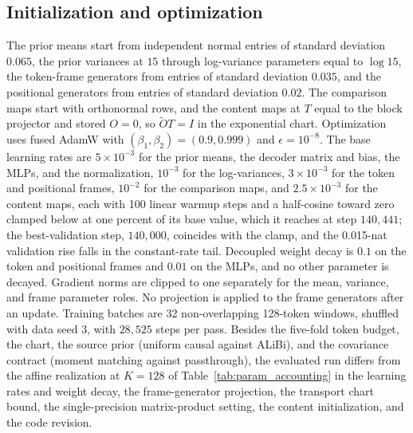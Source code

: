\documentclass[twoside,11pt]{article}
\begin{document}
\subsection{Initialization and optimization}
\label{app:run_optimization}

The prior means start from independent normal entries of standard deviation $0.065$, the prior variances at $15$ through log-variance parameters equal to $\log15$, the token-frame generators from entries of standard deviation $0.035$, and the positional generators from entries of standard deviation $0.02$. %
The comparison maps start with orthonormal rows, and the content maps at $T$ equal to the block projector and stored $O=0$, so $\widetilde OT=I$ in the exponential chart. %
Optimization uses fused AdamW \citep{Loshchilov2019AdamW} with $(\beta_1,\beta_2)=(0.9,0.999)$ and $\epsilon=10^{-8}$. The base learning rates are $5\times10^{-3}$ for the prior means, the decoder matrix and bias, the MLPs, and the normalization, $10^{-3}$ for the log-variances, $3\times10^{-3}$ for the token and positional frames, $10^{-2}$ for the comparison maps, and $2.5\times10^{-3}$ for the content maps, each with 100 linear warmup steps and a half-cosine toward zero clamped below at one percent of its base value, which it reaches at step $140{,}441$; the best-validation step, $140{,}000$, coincides with the clamp, and the 0.015-nat validation rise falls in the constant-rate tail. %
Decoupled weight decay is $0.1$ on the token and positional frames and $0.01$ on the MLPs, and no other parameter is decayed. %
Gradient norms are clipped to one separately for the mean, variance, and frame parameter roles. %
No projection is applied to the frame generators after an update. %
Training batches are 32 non-overlapping 128-token windows, shuffled with data seed 3, with $28{,}525$ steps per pass. %
Besides the five-fold token budget, the chart, the source prior (uniform causal against ALiBi), and the covariance contract (moment matching against passthrough), the evaluated run differs from the affine realization at $K=128$ of Table~\ref{tab:param_accounting} in the learning rates and weight decay, the frame-generator projection, the transport chart bound, the single-precision matrix-product setting, the content initialization, and the code revision. %
\end{document}
